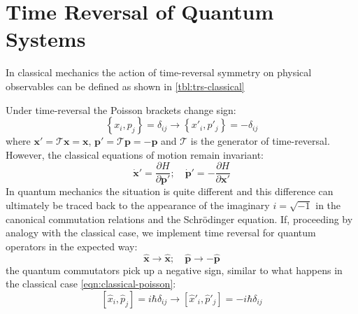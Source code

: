 \documentclass[preprint]{SciPost}
\newcommand{\mc}[1]{\mathcal{#1}}
\newcommand{\vect}[1]{\boldsymbol{#1}}
\theoremstyle{plain} %
\begin{document}
%

\printbibliography[title={Bibliography}]

\appendix

\renewcommand{\theequation}{\Alph{section}.\arabic{equation}}


\section{Time Reversal of Quantum Systems}\label{sec:time-reversal}

In classical mechanics the action of time-reversal symmetry on physical observables can be defined as shown in \autoref{tbl:trs-classical}


Under time-reversal the Poisson brackets change sign:
\begin{equation}\label{eqn:classical-poisson}
\left\{ x_i, p_j \right\} = \delta_{ij} \rightarrow \left\{ x'_i, p'_j \right\} = -\delta_{ij}
\end{equation}
where $ \vect{x'} = \mc{T} \vect{x} = \vect{x} $, $ \vect{p'} = \mc{T} \vect{p} = - \vect{p} $ and $ \mc{T} $ is the generator of time-reversal. However, the classical equations of motion remain invariant:
\begin{equation}\label{eqn:classical-eom}
\vect{\dot{x}'} = \frac{\partial H}{\partial \vect{p'}}; \quad \vect{\dot{p}'} = - \frac{\partial H}{\partial \vect{x'}}
\end{equation}
In quantum mechanics the situation is quite different and this difference can ultimately be traced back to the appearance of the imaginary $ i = \sqrt{-1} $ in the canonical commutation relations and the Schr\"{o}dinger equation. If, proceeding by analogy with the classical case, we implement time reversal for quantum operators in the expected way:
\begin{equation}\label{eqn:trs-quantum}
\vect{\hat{x}} \rightarrow \vect{\hat{x}}; \quad \vect{\hat{p}} \rightarrow -\vect{\hat{p}}
\end{equation}
the quantum commutators pick up a negative sign, similar to what happens in the classical case \eqref{eqn:classical-poisson}:
\begin{equation}\label{eqn:quantum-poisson}
\left[ \hat{x}_i, \hat{p}_j \right] = i \hbar \delta_{ij} \rightarrow \left[\hat{x}'_i, \hat{p}'_j \right] = - i \hbar \delta_{ij}
\end{equation}
\end{document}
